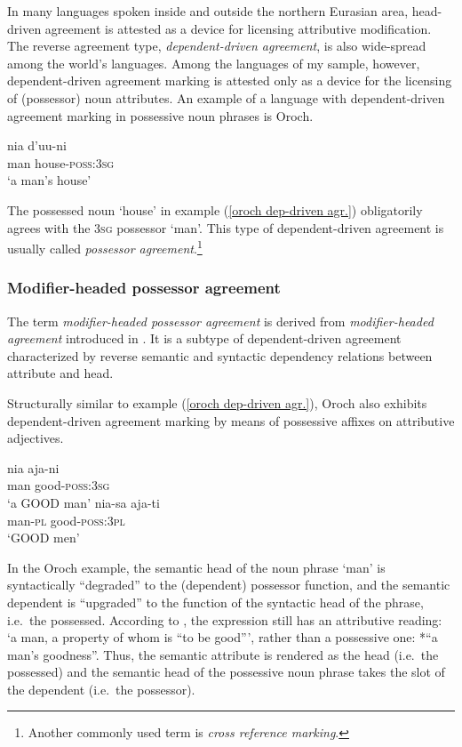 In many languages spoken inside and outside the northern Eurasian area, head-driven agreement is attested as a device for licensing attributive modification. The reverse agreement type, \emph{dependent-driven agreement}, is also wide-spread among the world's languages. Among the languages of my sample, however, dependent-driven agreement marking is attested only as a device for the licensing of (possessor) noun attributes. An example of a language with dependent-driven agreement marking in possessive noun phrases is Oroch.
\begin{exe}
\ex
{} \label{oroch dep-driven agr.}
\gll 	nia	d'uu-ni\\
	man	house-\textsc{poss:3sg}\\
\glt	‘a man's house’
\end{exe}
The possessed noun ‘house’ in example (\ref{oroch dep-driven agr.}) obligatorily agrees with the \textsc{3sg} possessor ‘man’. This type of dependent-driven agreement is usually called \emph{possessor agreement}.\footnote{Another commonly used term is \emph{cross reference marking}.}

\subsubsection{Modifier-headed possessor agreement} \label{ModheadAgr}

The term \emph{modifier-headed possessor agreement} is derived from \emph{modifier-headed agreement} introduced in \citet{AUTOTYP-NP}. It is a subtype of dependent-driven agreement characterized by reverse semantic and syntactic dependency relations between attribute and head. 

Structurally similar to example (\ref{oroch dep-driven agr.}), Oroch also exhibits dependent-driven agreement marking by means of possessive affixes on attributive adjectives.

\begin{exe}
\ex
{} \label{oroch mod-headed agr}
\begin{xlist}
\ex
\gll 	nia	aja-ni\\
	man	good-\textsc{poss:3sg}\\
\glt	‘a GOOD man’
\ex 
\gll nia-sa aja-ti\\	
	man-\textsc{pl} good-\textsc{poss:3pl}\\
\glt	‘GOOD men’
\end{xlist}
\end{exe}
In the Oroch example, the semantic head of the noun phrase ‘man’ is syntactically “degraded” to the (dependent) possessor function, and the semantic dependent is “upgraded” to the function of the syntactic head of the phrase, i.e.~the possessed. According to \citet[3]{malchukov2000}, the expression still has an attributive reading: ‘a man, a property of whom is “to be good”’, rather than a possessive one: *“a man's goodness”. Thus, the semantic attribute is rendered as the head (i.e.~the possessed) and the semantic head of the possessive noun phrase takes the slot of the dependent (i.e.~the possessor).

